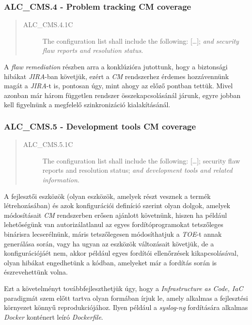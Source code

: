 \pagebreak[3]
\subsubsection{ALC\_CMS.4 - Problem tracking CM coverage}
\begin{quote}
    \begin{description}
        \item[ALC\_CMS.4.1C]{The configuration list shall include the following: [\ldots]; \emph{and
            security flaw reports and resolution status}.}
    \end{description}
\end{quote}

A \emph{flaw remediation} részben arra a konklúzióra jutottunk, hogy a biztonsági hibákat
\emph{JIRA}-ban \cite{JIRA} követjük, ezért a \emph{CM} rendszerhez érdemes hozzávennünk magát
a \emph{JIRA}-t is, pontosan úgy, mint ahogy az előző pontban tettük. Mivel azonban már három
független rendszer összekapcsolásánál járunk, egyre jobban kell figyelnünk a megfelelő
szinkronizáció kialakításánál.

\pagebreak[3]
\subsubsection{ALC\_CMS.5 - Development tools CM coverage}
\begin{quote}
    \begin{description}
        \item[ALC\_CMS.5.1C]{The configuration list shall include the following: [\ldots]; security
            flaw reports and resolution status; \emph{and development tools and related
            information}.}
    \end{description}
\end{quote}

A fejlesztői eszközök (olyan eszközök, amelyek részt vesznek a termék létrehozásában) és azok
konfigurációi definíció szerint olyan dolgok, amelyek módosításait \emph{CM} rendszerben erősen
ajánlott követnünk, hiszen ha például lehetőségünk van autorizálatlanul az egyes fordítóprogramokat
tetszőleges binárisra lecserélnünk, máris tetszőlegesen módosíthatjuk a \emph{TOE}-t annak
generálása során, vagy ha ugyan az eszközök változásait követjük, de a konfigurációjáét nem, akkor
például egyes fordítói ellenőrzések kikapcsolásával, olyan hibákat engedhetünk a kódban, amelyeket
már a fordítás során is észrevehettünk volna.

Ezt a követelményt továbbfejleszthetjük úgy, hogy a \emph{Infrastructure as Code, IaC}
\cite{huttermann2012infrastructure} paradigmát szem előtt tartva olyan formában írjuk le, amely
alkalmas a fejlesztési környezet könnyű reprodukciójához. Ilyen például a \emph{syslog-ng}
fordítására alkalmas \emph{Docker} konténert leíró \emph{Dockerfile}. \cite{syslogngenv}

